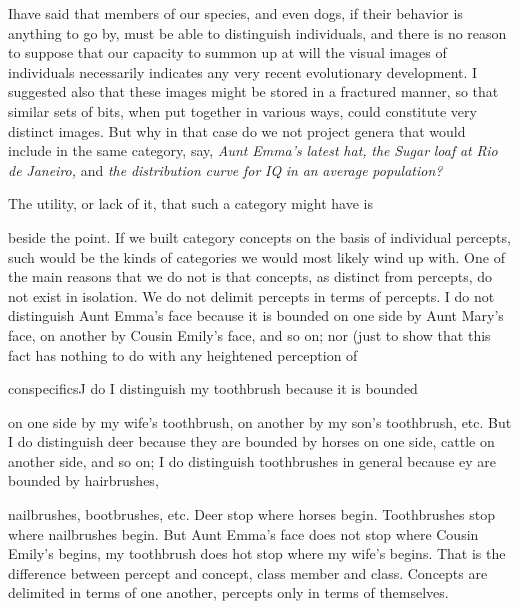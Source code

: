 Ihave said that members of our species, and even dogs, if their behavior is anything to go by, must be able to distinguish individuals, and there is no reason to suppose that our capacity to summon up at will the visual images of individuals necessarily indicates any very recent evolutionary development. I suggested also that these images might be stored in a fractured manner, so that similar sets of bits, when put together in various ways, could constitute very distinct images. But why in that case do we not project genera that would include in the same category, say, \textit{Aunt} \textit{Emma's} \textit{latest} \textit{hat,} \textit{the} \textit{Sugar\-} \textit{loaf} \textit{at} \textit{Rio} \textit{de} \textit{Janeiro,} and \textit{the} \textit{distribution} \textit{curve} \textit{for} \textit{IQ} \textit{in} \textit{an} \textit{average} \textit{population?}

The utility, or lack of it, that such a category might have is

beside the point. If we built category concepts on the basis of in\-dividual percepts, such would be the kinds of categories we would most likely wind up with. One of the main reasons that we do not is that concepts, as distinct from percepts, do not exist in isolation. We do not delimit percepts in terms of percepts. I do not distinguish Aunt Emma's face because it is bounded on one side by Aunt Mary's face, on another by Cousin Emily's face, and so on; nor (just to show that this fact has nothing to do with any heightened perception of

conspecificsJ do I distinguish my toothbrush because it is bounded

on one side by my wife's toothbrush, on another by my son's tooth\-brush, etc. But I do distinguish deer because they are bounded by horses on one side, cattle on another side, and so on; I do distinguish toothbrushes in general because ey are bounded by hairbrushes,


nailbrushes, bootbrushes, etc. Deer stop where horses begin. Tooth\-brushes stop where nailbrushes begin. But Aunt Emma's face does not stop where Cousin Emily's begins, my toothbrush does hot stop where my wife's begins. That is the difference between percept and concept, class member and class. Concepts are delimited in terms of one another, percepts only in terms of themselves.

